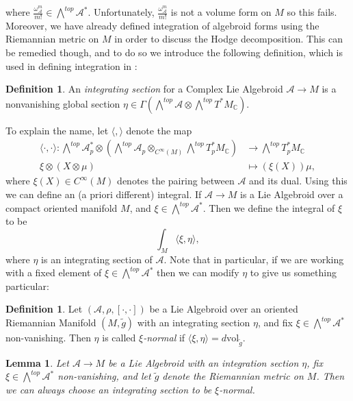 \documentclass{amsart}
\newcommand{\C}{\mathbb{C}}
\newcommand{\ra}{\rightarrow}
\newtheorem{lemma}[theorem]{Lemma}
\theoremstyle{definition}
\newtheorem{definition}[theorem]{Definition}
\newcommand{\A}{\mathcal{A}}
\theoremstyle{definition}
\begin{document}
 where $\frac {\omega_\A^m}{m!} \in \bigwedge^{top}\A^*$. Unfortunately, $\frac{\omega_\A^m}{m!}$ is not a volume form on $M$ so this fails. Moreover, we have already defined integration of algebroid forms using the Riemannian metric on $M$ in order to discuss the Hodge decomposition. This can be remedied though, and to do so we introduce the following definition, which is used in defining integration in \cite{MR4722602}:
 \begin{definition}
     An \textit{integrating section} for a Complex Lie Algebroid $\A \ra M$ is a nonvanishing global section $\eta \in \Gamma(\bigwedge^{top}\A \otimes \bigwedge^{top}T^*M_\C)$.
 \end{definition}
To explain the name, let $\langle , \rangle$ denote the map
\begin{align*}
    \langle \cdot , \cdot \rangle: \bigwedge^{top} \A^*_p \otimes \left(\bigwedge^{top}\A_p \otimes_{C^\infty(M)}\bigwedge^{top}T_p^*M_\C \right) &\ra \bigwedge^{top}T_p^*M_\C \\
    \xi \otimes ( X\otimes \mu) &\mapsto  (\xi( X) )\mu,
\end{align*}
where $\xi( X)  \in C^\infty(M)$ denotes the pairing between $\A$ and its dual. Using this we can define an (a priori different) integral.
    If $\A \ra M$ is a Lie Algebroid over a compact oriented manifold $M$, and $\xi \in \bigwedge^{top}\A^*$. Then we define the integral of $\xi$ to be
    \begin{equation*}
        \int_M \langle\xi, \eta \rangle,
    \end{equation*}
where $\eta$ is an integrating section of $\A$. Note that in particular, if we are working with a fixed element of $\xi \in \bigwedge^{top}\A^*$ then we can modify $\eta$ to give us something particular:
\begin{definition}
    Let $(\A,\rho ,[\cdot, \cdot])$ be a Lie Algebroid over an oriented Riemannian Manifold $(M,\tilde{g})$ with an integrating section $\eta$, and fix $\xi \in \bigwedge^{top}\A^*$ non-vanishing. Then $\eta$ is called \textit{$\xi$-normal} if $\langle  \xi , \eta \rangle = d \text{vol}_{\tilde{g}}$.
\end{definition}
\begin{lemma}\label{normalization}
    Let $\A \ra M$ be a Lie Algebroid with an integration section $\eta$, fix $\xi \in \bigwedge^{top}\A^*$ non-vanishing, and let $\tilde{g}$ denote the Riemannian metric on $M$. Then we can always choose an integrating section to be $\xi$-normal.
\end{lemma}
\end{document}
